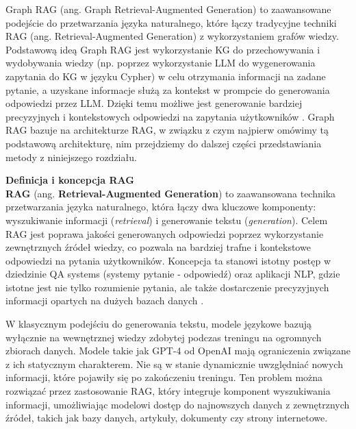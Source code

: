\documentclass[
a4paper,
12pt,
]{article}
\newcounter{subsubsubsection}[subsubsection]
\begin{document}


\label{sec:defgrag}

Graph RAG (ang. Graph Retrieval-Augmented Generation) to zaawansowane podejście do przetwarzania języka naturalnego, które łączy tradycyjne techniki RAG (ang. Retrieval-Augmented Generation) z wykorzystaniem grafów wiedzy. 
Podstawową ideą Graph RAG jest wykorzystanie KG do przechowywania i wydobywania wiedzy (np. poprzez wykorzystanie LLM do wygenerowania zapytania do KG  w języku Cypher) w celu otrzymania informacji na zadane pytanie, a uzyskane informacje służą za kontekst w prompcie do generowania odpowiedzi przez LLM. Dzięki temu możliwe jest generowanie bardziej precyzyjnych i kontekstowych odpowiedzi na zapytania użytkowników \cite{graphRAG}. 
Graph RAG bazuje na architekturze RAG, w związku z czym najpierw omówimy tą podstawową architekturę, nim przejdziemy do dalszej części przedstawiania metody z niniejszego rozdziału.\newline


\noindent\textbf{Definicja i koncepcja RAG}\\

\textbf{RAG} (ang. \textbf{Retrieval-Augmented Generation}) to zaawansowana technika przetwarzania języka naturalnego, która łączy dwa kluczowe komponenty: wyszukiwanie informacji (\textit{retrieval}) i generowanie tekstu (\textit{generation}). Celem RAG jest poprawa jakości generowanych odpowiedzi poprzez wykorzystanie zewnętrznych źródeł wiedzy, co pozwala na bardziej trafne i kontekstowe odpowiedzi na pytania użytkowników. Koncepcja ta stanowi istotny postęp w dziedzinie QA systems (systemy pytanie - odpowiedź) oraz aplikacji NLP, gdzie istotne jest nie tylko rozumienie pytania, ale także dostarczenie precyzyjnych informacji opartych na dużych bazach danych \cite{rag}. 

W klasycznym podejściu do generowania tekstu, modele językowe bazują wyłącznie na wewnętrznej wiedzy zdobytej podczas treningu na ogromnych zbiorach danych. Modele takie jak GPT-4 od OpenAI mają ograniczenia związane z ich statycznym charakterem. Nie są w stanie dynamicznie uwzględniać nowych informacji, które pojawiły się po zakończeniu treningu. Ten problem można rozwiązać przez zastosowanie RAG, który integruje komponent wyszukiwania informacji, umożliwiając modelowi dostęp do najnowszych danych z zewnętrznych źródeł, takich jak bazy danych, artykuły, dokumenty czy strony internetowe.
\end{document}
